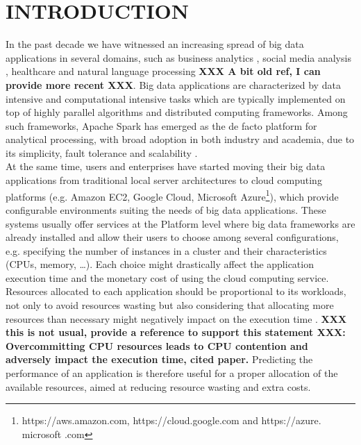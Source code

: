 \documentclass[a4paper, 10pt, conference]{ieeeconf}      %
\begin{document}
\section{INTRODUCTION}
In the past decade we have witnessed an increasing spread of big data applications in several domains, such as business analytics \cite{sun2018big}, social media analysis \cite{ghani2019social}, healthcare \cite{kulkarni2020big} and natural language processing \cite{Hirschberg261} \textbf{XXX A bit old ref, I can provide more recent XXX}.
Big data applications are characterized by data intensive and computational intensive tasks which are typically implemented on top of highly parallel algorithms and distributed computing frameworks. Among such frameworks, Apache Spark has emerged as the de facto platform for analytical processing, with broad adoption in both industry and academia, due to its simplicity, fault tolerance and scalability \cite{Hirschberg261}.\\
At the same time, users and enterprises have started moving their big data applications from  traditional local server architectures to cloud computing platforms (e.g. Amazon EC2, Google Cloud, Microsoft Azure\footnote{https://aws.amazon.com, https://cloud.google.com and https://azure. microsoft .com }), which provide configurable environments suiting the needs of big data applications.
These systems usually offer services at the Platform level  where big data  frameworks are already installed and allow their users to choose among several configurations, e.g. specifying the number of instances in a cluster and their characteristics (CPUs, memory, \ldots).
Each choice might drastically affect  the application execution time and the monetary cost of using the cloud computing service. 
Resources allocated to each application should be proportional to its workloads, not only to avoid resources wasting but also considering that allocating more resources than necessary might negatively impact on the execution time \cite{li2015sparkbench}. \textbf{XXX this is not usual, provide a reference to support this statement XXX: Overcommitting CPU resources leads to CPU contention and adversely impact the execution time, cited paper. }
Predicting the performance of an application is therefore useful for a proper allocation of the available resources, aimed at reducing resource wasting and extra costs.
\end{document}
